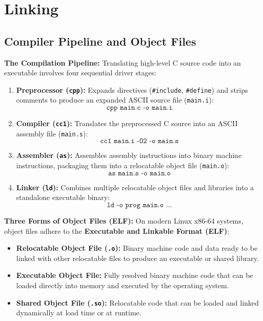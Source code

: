 \section{Linking}

\subsection{Compiler Pipeline and Object Files}

\begin{definition}
    \textbf{The Compilation Pipeline:} Translating high-level C source code into an executable involves four sequential driver stages:
    \begin{enumerate}
        \item \textbf{Preprocessor (\texttt{cpp}):} Expands directives (\texttt{\#include}, \texttt{\#define}) and strips comments to produce an expanded ASCII source file (\texttt{main.i}):
        $$
            \texttt{cpp main.c -o main.i}
        $$
        \item \textbf{Compiler (\texttt{cc1}):} Translates the preprocessed C source into an ASCII assembly file (\texttt{main.s}):
        $$
            \texttt{cc1 main.i -O2 -o main.s}
        $$
        \item \textbf{Assembler (\texttt{as}):} Assembles assembly instructions into binary machine instructions, packaging them into a relocatable object file (\texttt{main.o}):
        $$
            \texttt{as main.s -o main.o}
        $$
        \item \textbf{Linker (\texttt{ld}):} Combines multiple relocatable object files and libraries into a standalone executable binary:
        $$
            \texttt{ld -o prog main.o ...}
        $$
    \end{enumerate}
\end{definition}

\begin{definition}
    \textbf{Three Forms of Object Files (ELF):} On modern Linux x86-64 systems, object files adhere to the \textbf{Executable and Linkable Format (ELF)}:
    \begin{itemize}
        \item \textbf{Relocatable Object File (\texttt{.o}):} Binary machine code and data ready to be linked with other relocatable files to produce an executable or shared library.
        \item \textbf{Executable Object File:} Fully resolved binary machine code that can be loaded directly into memory and executed by the operating system.
        \item \textbf{Shared Object File (\texttt{.so}):} Relocatable code that can be loaded and linked dynamically at load time or at runtime.
    \end{itemize}
\end{definition}

